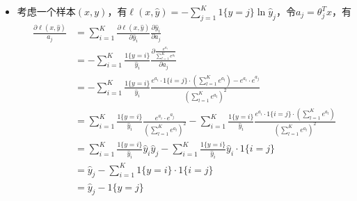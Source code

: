 \documentclass[10pt,a4paper]{ctexbook}
\begin{document}
\begin{itemize}
\item 考虑一个样本$(x,y)$，有$\ell(x,\hat{y})=-\sum\limits_{j=1}^{K}{1\{y=j\}\ln{\hat{y}_{j}}}$，令$a_{j}={\theta_{j}^{T}x}$，有
\begin{align*}
{\frac {\partial \ell(x,\hat{y})}{a_{j}}}&=\sum\limits_{i=1}^{K}{{\frac {\partial \ell(x,\hat{y})}{\partial \hat{y}_{i}}}{\frac {\partial \hat{y}_{i}}{\partial a_{j}}}}\\
                                         &=-\sum\limits_{i=1}^{K}{
                                                {\frac {1\{y=i\}}{\hat{y}_{i}}}
                                                {\frac {\partial \frac {e^{a_{i}}}{\sum_{l=1}^{K}{e^{a_{l}}}}}{\partial a_{j}}}}\\
                                         &=-\sum\limits_{i=1}^{K}{
                                                {\frac {1\{y=i\}}{\hat{y}_{i}}}
                                                {\frac {
                                                            e^{a_{i}} \cdot 1\{i=j\} \cdot {\left({\sum_{l=1}^{K}{e^{a_{l}}}}\right)}
                                                            -e^{a_{i}} \cdot e^{a_{j}}
                                                        }
                                                       {\left({\sum_{l=1}^{K}{e^{a_{l}}}}\right)^{2}}
                                                    }}\\
                                         &=\sum\limits_{i=1}^{K}{
                                                {\frac {1\{y=i\}}{\hat{y}_{i}}}
                                                {\frac {e^{a_{i}} \cdot e^{a_{j}}}
                                                       {\left({\sum_{l=1}^{K}{e^{a_{l}}}}\right)^{2}}
                                                    }}
                                            -\sum\limits_{i=1}^{K}{
                                                {\frac {1\{y=i\}}{\hat{y}_{i}}}
                                                {\frac {e^{a_{i}} \cdot 1\{i=j\} \cdot {\left({\sum_{l=1}^{K}{e^{a_{l}}}}\right)}}
                                                       {\left({\sum_{l=1}^{K}{e^{a_{l}}}}\right)^{2}}
                                                    }}\\
                                         &=\sum\limits_{i=1}^{K}{{\frac {1\{y=i\}}{\hat{y}_{i}}}{\hat{y}_{i}}{\hat{y}_{j}}}
                                            -\sum\limits_{i=1}^{K}{{\frac {1\{y=i\}}{\hat{y}_{i}}}{\hat{y}_{i}} \cdot 1\{i=j\}}\\
                                         &={\hat{y}_{j}}-\sum\limits_{i=1}^{K}{{1\{y=i\}}} \cdot 1\{i=j\}\\
                                         &={\hat{y}_{j}}-{1\{y=j\}} \\
\end{align*}



\end{itemize}
\end{document}
